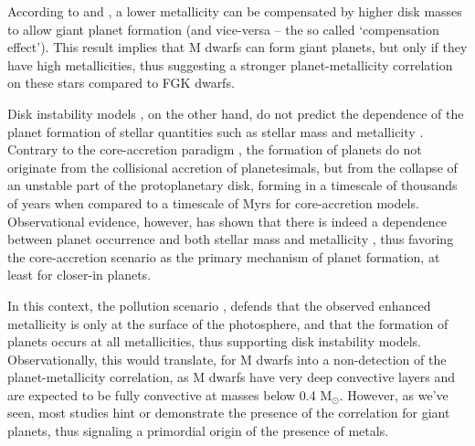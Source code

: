 \documentclass[structabstract]{aa}
\begin{document}








According to \citet{Thommes-2008} and \citet{Mordasini-2012}, a lower metallicity can be compensated by higher disk masses to allow giant planet formation (and vice-versa -- the so called `compensation effect'). This result implies that M dwarfs can form giant planets, but only if they have high metallicities, thus suggesting a stronger planet-metallicity correlation on these stars compared to FGK dwarfs. 

Disk instability models \citep[e.g.][]{Boss-1997}, on the other hand, do not predict the dependence of the planet formation of stellar quantities such as stellar mass \citep[e.g.][]{Boss-2006a} and metallicity \citep{Boss-2002}. Contrary to the core-accretion paradigm \citep{Pollack-1996}, the formation of planets do not originate from the collisional accretion of planetesimals, but from the collapse of an unstable part of the protoplanetary disk, forming in a timescale of thousands of years when compared to a timescale of Myrs for core-accretion models. Observational evidence, however, has shown that there is indeed a dependence between planet occurrence and both stellar mass and metallicity \citep[e.g.][Johnson-2010]{}, thus favoring the core-accretion scenario as the primary mechanism of planet formation, at least for closer-in planets. 

In this context, the pollution scenario \citep[e.g.][]{Murray-2002}, defends that the observed enhanced metallicity is only at the surface of the photosphere, and that the formation of planets occurs at all metallicities, thus supporting disk instability models. Observationally, this would translate, for M dwarfs into a non-detection of the planet-metallicity correlation, as M dwarfs have very deep convective layers and are expected to be fully convective at masses below 0.4 M$_{\odot}$. However, as we've seen, most studies hint or demonstrate the presence of the correlation for giant planets, thus signaling a primordial origin of the presence of metals.
\end{document}
